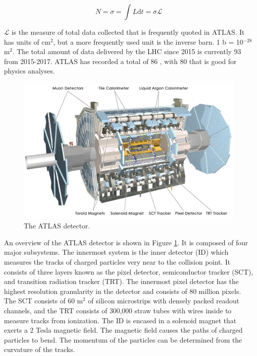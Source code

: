 \begin{equation}
N = \sigma = \int{L} \text{d}t = \sigma \mathcal{L}
\end{equation}

\noindent $\mathcal{L}$ is the measure of total data collected that is frequently quoted in ATLAS. It has units of cm$^2$, but a more frequently used unit is the inverse barn. 1 b = 10$^{-28}$ m$^2$. The total amount of data delivered by the LHC since 2015 is currently 93 \ifb from 2015-2017. ATLAS has recorded a total of 86 \ifb, with 80 \ifb that is good for physics analyses.

\begin{figure}[htb]
\centering
\includegraphics[width=1\textwidth]{Figures/atlas.jpg}
\caption{The ATLAS detector.}
\label{fig:atlas}
\end{figure}

An overview of the ATLAS detector is shown in Figure \ref{fig:atlas}. It is composed of four major subsystems. The innermost system is the inner detector (ID) which measures the tracks of charged particles very near to the collision point. It consists of three layers known as the pixel detector, semiconductor tracker (SCT), and transition radiation tracker (TRT). The innermost pixel detector has the highest resolution granularity in the detector and consists of 80 million pixels. The SCT consists of 60 m$^2$ of silicon microstrips with densely packed readout channels, and the TRT consists of 300,000 straw tubes with wires inside to measure tracks from ionization. The ID is encased in a solenoid magnet that exerts a 2 Tesla magnetic field. The magnetic field causes the paths of charged particles to bend. The momentum of the particles can be determined from the curvature of the tracks.

